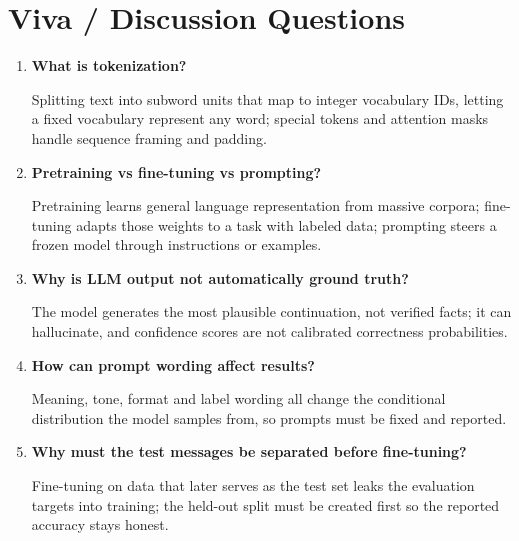 \section{Viva / Discussion Questions}
\begin{enumerate}
  \item \textbf{What is tokenization?}\par\nobreak Splitting text into subword units that map to integer
  vocabulary IDs, letting a fixed vocabulary represent any word; special tokens and attention
  masks handle sequence framing and padding.
  \item \textbf{Pretraining vs fine-tuning vs prompting?}\par\nobreak Pretraining learns general language
  representation from massive corpora; fine-tuning adapts those weights to a task with labeled
  data; prompting steers a frozen model through instructions or examples.
  \item \textbf{Why is LLM output not automatically ground truth?}\par\nobreak The model generates the most
  plausible continuation, not verified facts; it can hallucinate, and confidence scores are not
  calibrated correctness probabilities.
  \item \textbf{How can prompt wording affect results?}\par\nobreak Meaning, tone, format and label wording all
  change the conditional distribution the model samples from, so prompts must be fixed and
  reported.
\item \textbf{Why must the test messages be separated before fine-tuning?}\par\nobreak Fine-tuning on data that later serves as the test set leaks the evaluation targets into training; the held-out split must be created first so the reported accuracy stays honest.
\end{enumerate}

